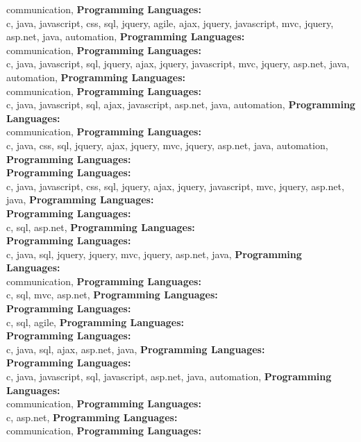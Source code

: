 communication, \textbf{Programming Languages:} \\
c, java, javascript, css, sql, jquery, agile, ajax,  jquery, javascript, mvc, jquery, asp.net, java, automation, \textbf{Programming Languages:} \\
communication, \textbf{Programming Languages:} \\
c, java, javascript, sql, jquery, ajax,  jquery, javascript, mvc, jquery, asp.net, java, automation, \textbf{Programming Languages:} \\
communication, \textbf{Programming Languages:} \\
c, java, javascript, sql, ajax, javascript, asp.net, java, automation, \textbf{Programming Languages:} \\
communication, \textbf{Programming Languages:} \\
c, java, css, sql, jquery, ajax,  jquery, mvc, jquery, asp.net, java, automation, \textbf{Programming Languages:} \\
\textbf{Programming Languages:} \\
c, java, javascript, css, sql, jquery, ajax,  jquery, javascript, mvc, jquery, asp.net, java, \textbf{Programming Languages:} \\
\textbf{Programming Languages:} \\
c, sql, asp.net, \textbf{Programming Languages:} \\
\textbf{Programming Languages:} \\
c, java, sql, jquery,  jquery, mvc, jquery, asp.net, java, \textbf{Programming Languages:} \\
communication, \textbf{Programming Languages:} \\
c, sql, mvc, asp.net, \textbf{Programming Languages:} \\
\textbf{Programming Languages:} \\
c, sql, agile, \textbf{Programming Languages:} \\
\textbf{Programming Languages:} \\
c, java, sql, ajax, asp.net, java, \textbf{Programming Languages:} \\
\textbf{Programming Languages:} \\
c, java, javascript, sql, javascript, asp.net, java, automation, \textbf{Programming Languages:} \\
communication, \textbf{Programming Languages:} \\
c, asp.net, \textbf{Programming Languages:} \\
communication, \textbf{Programming Languages:} \\
